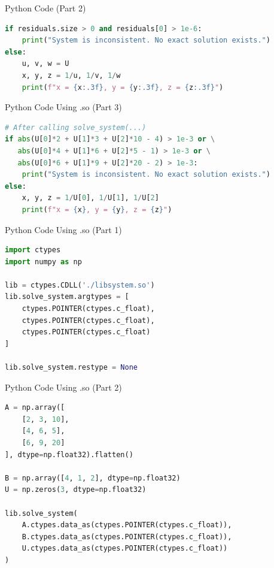 \documentclass{beamer}
\begin{document}
\begin{frame}[fragile]{Python Code (Part 2)}
\begin{lstlisting}[language=Python]
if residuals.size > 0 and residuals[0] > 1e-6:
    print("System is inconsistent. No exact solution exists.")
else:
    u, v, w = U
    x, y, z = 1/u, 1/v, 1/w
    print(f"x = {x:.3f}, y = {y:.3f}, z = {z:.3f}")
\end{lstlisting}
\end{frame}

\begin{frame}[fragile]{Python Code Using .so (Part 3)}
\begin{lstlisting}[language=Python]
# After calling solve_system(...)
if abs(U[0]*2 + U[1]*3 + U[2]*10 - 4) > 1e-3 or \
   abs(U[0]*4 + U[1]*6 + U[2]*5 - 1) > 1e-3 or \
   abs(U[0]*6 + U[1]*9 + U[2]*20 - 2) > 1e-3:
    print("System is inconsistent. No exact solution exists.")
else:
    x, y, z = 1/U[0], 1/U[1], 1/U[2]
    print(f"x = {x}, y = {y}, z = {z}")
\end{lstlisting}
\end{frame}

\begin{frame}[fragile]{Python Code Using .so (Part 1)}
\begin{lstlisting}[language=Python]
import ctypes
import numpy as np

lib = ctypes.CDLL('./libsystem.so')
lib.solve_system.argtypes = [
    ctypes.POINTER(ctypes.c_float),
    ctypes.POINTER(ctypes.c_float),
    ctypes.POINTER(ctypes.c_float)
]

lib.solve_system.restype = None
\end{lstlisting}
\end{frame}


\begin{frame}[fragile]{Python Code Using .so (Part 2)}
\begin{lstlisting}[language=Python]
A = np.array([
    [2, 3, 10],
    [4, 6, 5],
    [6, 9, 20]
], dtype=np.float32).flatten()

B = np.array([4, 1, 2], dtype=np.float32)
U = np.zeros(3, dtype=np.float32)

lib.solve_system(
    A.ctypes.data_as(ctypes.POINTER(ctypes.c_float)),
    B.ctypes.data_as(ctypes.POINTER(ctypes.c_float)),
    U.ctypes.data_as(ctypes.POINTER(ctypes.c_float))
)
\end{lstlisting}
\end{frame}
\end{document}
